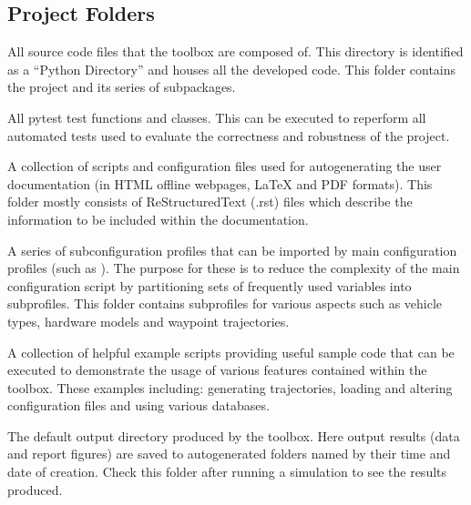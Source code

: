 \documentclass[letterpaper,10pt,english]{sphinxmanual}
\begin{document}
\subsection{Project Folders}
\label{\detokenize{usage/structure:project-folders}}\begin{description}
\sphinxAtStartPar
All source code files that the toolbox are composed of. This directory is identified as a “Python Directory”
and houses all the developed code. This folder contains the project  and its series of sub\sphinxhyphen{}packages.

\sphinxAtStartPar
All pytest test functions and classes. This can be executed to re\sphinxhyphen{}perform all automated tests used to evaluate
the correctness and robustness of the project.

\sphinxAtStartPar
A collection of scripts and configuration files used for auto\sphinxhyphen{}generating the user documentation
(in HTML offline webpages, LaTeX and PDF formats). This folder mostly consists of ReStructuredText (.rst)
files which describe the information to be included within the documentation.

\sphinxAtStartPar
A series of sub\sphinxhyphen{}configuration profiles that can be imported by main configuration profiles (such as
). The purpose for these is to reduce the complexity of the main configuration script
by partitioning sets of frequently used variables into sub\sphinxhyphen{}profiles. This folder contains sub\sphinxhyphen{}profiles for various
aspects such as vehicle types, hardware models and waypoint trajectories.

\sphinxAtStartPar
A collection of helpful example scripts providing useful sample code that can be executed to demonstrate the usage of
various features contained within the toolbox. These examples including: generating trajectories,
loading and altering configuration files and using various databases.

\sphinxAtStartPar
The default output directory produced by the toolbox. Here output results (data and report figures) are saved
to auto\sphinxhyphen{}generated folders named by their time and date of creation. Check this folder after running a simulation
to see the results produced.

\end{description}
\end{document}
